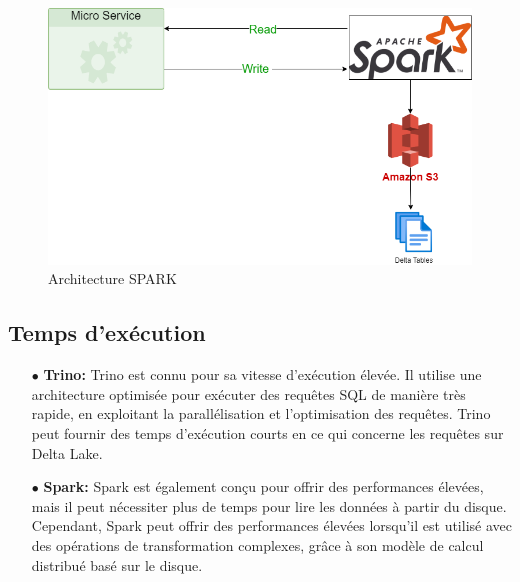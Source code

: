\begin{figure}[H]
\centering
\includegraphics[width=\linewidth]{images/archi-spark.png}
\caption{Architecture SPARK}\label{fig:arch-spark}
\end{figure}
    
\subsection{Temps d'exécution}
\begin{enumerate}
    \item[$\bullet$] \textbf{Trino:} Trino est connu pour sa vitesse d'exécution élevée. Il utilise une architecture optimisée pour exécuter des requêtes SQL de manière très rapide, en exploitant la parallélisation et l'optimisation des requêtes. Trino peut fournir des temps d'exécution courts en ce qui concerne les requêtes sur Delta Lake.
    \item[$\bullet$] \textbf{Spark:} Spark est également conçu pour offrir des performances élevées, mais il peut nécessiter plus de temps pour lire les données à partir du disque. Cependant, Spark peut offrir des performances élevées lorsqu'il est utilisé avec des opérations de transformation complexes, grâce à son modèle de calcul distribué basé sur le disque.
\end{enumerate}

